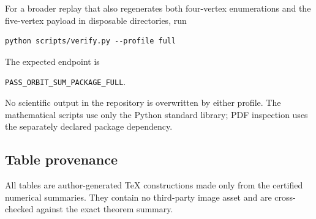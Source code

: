 For a broader replay that also regenerates both four-vertex enumerations and
the five-vertex payload in disposable directories, run
\begin{verbatim}
python scripts/verify.py --profile full
\end{verbatim}
The expected endpoint is
\begin{center}\small
\texttt{PASS\_ORBIT\_SUM\_PACKAGE\_FULL}.
\end{center}
No scientific output in the repository is overwritten by either profile.
The mathematical scripts use only the Python standard library; PDF inspection
uses the separately declared package dependency.

\subsection{Table provenance}

All tables are author-generated TeX constructions made only from the
certified numerical summaries.  They contain no third-party image asset and
are cross-checked against the exact theorem summary.
